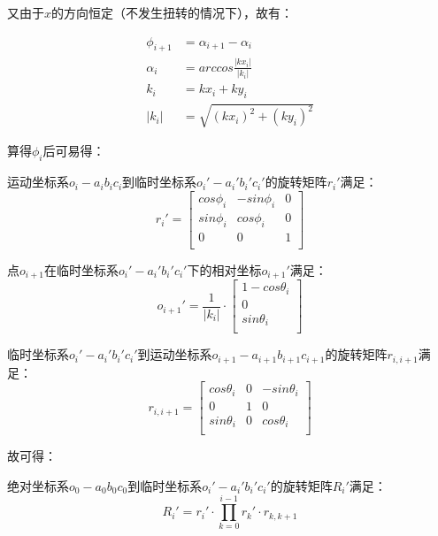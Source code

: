 \begin{itemize}
又由于$x$的方向恒定（不发生扭转的情况下），故有：

\begin{align}
\phi_{i+1} &= \alpha_{i+1} - \alpha_i \\
\alpha_i &= arccos\frac{|kx_i|}{|k_i|} \\
k_i &= kx_i + ky_i \\
|k_i| &= \sqrt{(kx_i)^2 + (ky_i)^2}
\end{align}

算得$\phi_i$后可易得：

运动坐标系$o_i-a_ib_ic_i$到临时坐标系$o_i'-a_i'b_i'c_i'$的旋转矩阵$r_i'$满足：
    \begin{equation}
    r_i' = \left[
            \begin{matrix}
            cos\phi_i & -sin\phi_i & 0\\
            sin\phi_i & cos\phi_i & 0\\
            0 & 0 & 1\\
            \end{matrix}
        \right]
    \end{equation}
    
点$o_{i+1}$在临时坐标系$o_i'-a_i'b_i'c_i'$下的相对坐标$o_{i+1}'$满足：
    \begin{equation}
    o_{i+1}' = \frac{1}{|k_i|} \cdot \left[
      \begin{matrix}
    	1 - cos\theta_i\\
    	0 \\
      sin\theta_i\\
      \end{matrix}
    \right]
    \end{equation}
    
临时坐标系$o_i'-a_i'b_i'c_i'$到运动坐标系$o_{i+1}-a_{i+1}b_{i+1}c_{i+1}$的旋转矩阵$r_{i, i+1}$满足：
    \begin{equation}
    r_{i, i+1} = \left[
      \begin{matrix}
      cos \theta_i & 0 & -sin \theta_i\\
      0 &1 & 0\\
      sin \theta_i & 0 & cos \theta_i\\
      \end{matrix}
    \right]
    \end{equation}

故可得：

绝对坐标系$o_0-a_0b_0c_0$到临时坐标系$o_i'-a_i'b_i'c_i'$的旋转矩阵$R_i'$满足：
    \begin{equation}
    R_i' = r_i' \cdot \prod_{k = 0}^{i-1} r_k' \cdot r_{k, k+1}
    \end{equation}
    

\end{itemize}
